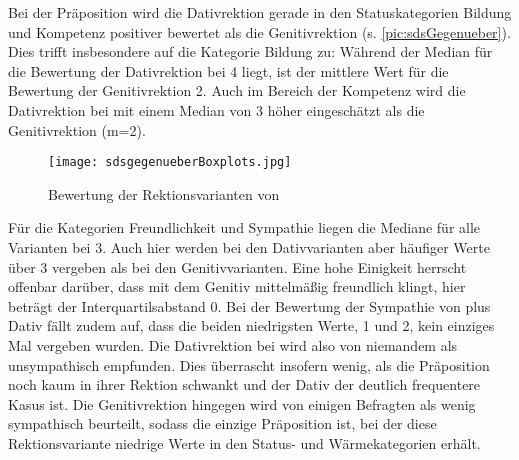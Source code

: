 Bei der Präposition \gegenueber{} wird die Dativrektion gerade in den Statuskategorien Bildung und Kompetenz positiver bewertet als die Genitivrektion (s. \autoref{pic:sdsGegenueber}). 
Dies trifft insbesondere auf die Kategorie Bildung zu:
Während der Median für die Bewertung der Dativrektion bei 4 liegt, ist der mittlere Wert für die Bewertung der Genitivrektion 2. 
Auch im Bereich der Kompetenz wird die Dativrektion bei \gegenueber{} mit einem Median von 3 höher eingeschätzt als die Genitivrektion (m=2). 
\begin{figure}
\centering
\texttt{[image: sdsgegenueberBoxplots.jpg]}
\caption{Bewertung der Rektionsvarianten von \gegenueber}
\label{pic:sdsGegenueber}
\end{figure}

Für die Kategorien Freundlichkeit und Sympathie liegen die Mediane für alle Varianten bei 3. 
Auch hier werden bei den Dativvarianten aber häufiger Werte über 3 vergeben als bei den Genitivvarianten. 
Eine hohe Einigkeit herrscht offenbar darüber, dass \gegenueber{} mit dem Genitiv mittelmäßig freundlich klingt, hier beträgt der Interquartilsabstand 0.  
Bei der Bewertung der Sympathie von \gegenueber{} plus Dativ fällt zudem auf, dass die beiden niedrigsten Werte, 1 und 2, kein einziges Mal vergeben wurden. 
Die Dativrektion bei \gegenueber{} wird also von niemandem als unsympathisch empfunden.
Dies überrascht insofern wenig, als die Präposition noch kaum in ihrer Rektion schwankt und der Dativ der deutlich frequentere Kasus ist. %
Die Genitivrektion hingegen wird von einigen Befragten als wenig sympathisch beurteilt, sodass \gegenueber{} die einzige Präposition ist, bei der diese Rektionsvariante niedrige Werte in den Status- und Wärmekategorien erhält. %

